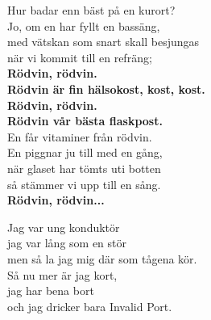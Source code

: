 \documentclass[a6paper, 10pt, twoside]{article}
\begin{document}
\noindent
\begin{center}
\end{center}
\begin{lyrics}
Hur badar enn bäst på en kurort?\\
Jo, om en har fyllt en bassäng,\\
med vätskan som snart skall besjungas\\
när vi kommit till en refräng;
\vspace{5pt}\\
\textbf{Rödvin, rödvin.\\
Rödvin är fin hälsokost, kost, kost.\\
Rödvin, rödvin.\\
Rödvin vår bästa flaskpost.}
\vspace{5pt}\\
En får vitaminer från rödvin.\\
En piggnar ju till med en gång,\\
när glaset har tömts uti botten\\
så stämmer vi upp till en sång.
\vspace{5pt}\\
\textbf{Rödvin, rödvin...}
\end{lyrics}
\vspace{30pt}
\begin{center}
\end{center}
\begin{lyrics}
Jag var ung konduktör\\
jag var lång som en stör\\
men så la jag mig där som tågena kör.
\vspace{5pt}\\
Så nu mer är jag kort,\\
jag har bena bort\\
och jag dricker bara Invalid Port.
\end{lyrics}
\end{document}
